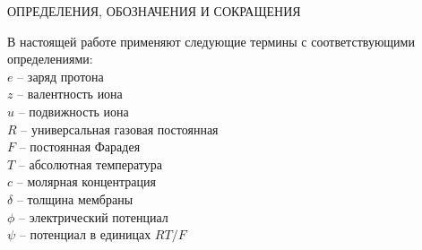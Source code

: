 \begin{center}
    ОПРЕДЕЛЕНИЯ, ОБОЗНАЧЕНИЯ И СОКРАЩЕНИЯ
\end{center}

В настоящей работе применяют следующие термины с соответствующими
определениями:\\
$e$ -- заряд протона\\
$z$ -- валентность иона\\
$u$ -- подвижность иона\\
$R$ -- универсальная газовая постоянная\\
$F$ -- постоянная Фарадея\\
$T$ -- абсолютная температура\\
$c$ -- молярная концентрация\\
$\delta$ -- толщина мембраны\\
$\phi$ -- электрический потенциал\\
$\psi$ -- потенциал в единицах \(RT/F\)

